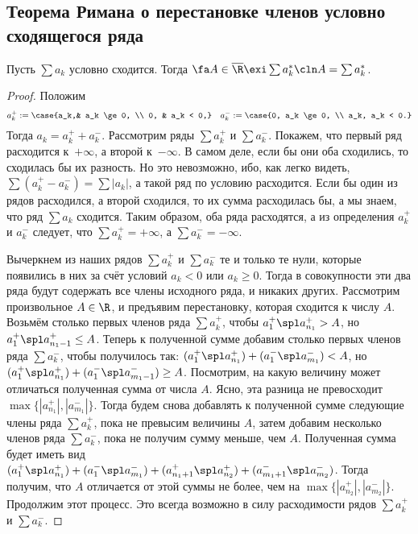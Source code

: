 \documentclass[a4paper]{article}
\newcommand{\sap}[2]{a_{{#1}}^+ \spl a_{{#2}}^+}
\newcommand{\sam}[2]{a_{{#1}}^- \spl a_{{#2}}^-}
\begin{document}
\subsection{Теорема Римана о перестановке членов условно сходящегося ряда}

\begin{theorem}[Римана]
Пусть $\sum a_k$ условно сходится. Тогда $\fa A \in \overline{\R} \exi \sum a_k^*\cln A=\sum a_k^*$.
\end{theorem}
\begin{proof}
Положим $$a_k^+ := \case{a_k,& a_k \ge 0, \\ 0, & a_k < 0,} \quad
a_k^- := \case{0, a_k \ge 0, \\ a_k, a_k < 0.}$$
Тогда $a_k = a_k^+ + a_k^-$. Рассмотрим ряды
$\sum a_k^+$ и $\sum a_k^-$. Покажем, что первый ряд расходится к~$+\infty$, а второй к~$-\infty$. В самом деле, если бы они оба сходились,
то сходилась бы их разность. Но это невозможно, ибо, как легко видеть, $\sum (a_k^+ - a_k^-) = \sum |a_k|$, а такой ряд по условию расходится.
Если бы один из рядов расходился, а второй сходился, то их сумма расходилась бы, а мы знаем, что ряд $\sum a_k$ сходится. Таким образом,
оба ряда расходятся, а из определения $a_k^+$ и $a_k^-$ следует, что $\sum a_k^+ = +\infty$, а $\sum a_k^-=-\infty$.

Вычеркнем из наших рядов $\sum a_k^+$ и $\sum a_k^-$ те и только те нули, которые появились в них за счёт условий $a_k <0$ или $a_k \ge 0$.
Тогда в совокупности эти два ряда будут содержать все члены исходного ряда, и никаких других.
Рассмотрим произвольное $A \in \R$,
и предъявим перестановку, которая сходится к числу $A$. Возьмём столько первых членов ряда $\sum a_k^+$, чтобы
$\sap{1}{n_1} > A$, но $\sap{1}{n_1-1} \le A$. Теперь к полученной сумме добавим столько первых членов ряда $\sum a_k^-$, чтобы
получилось так: $(\sap{1}{n_1}) + (\sam{1}{m_1}) < A$, но $(\sap{1}{n_1}) + (\sam{1}{m_1-1}) \ge A$. Посмотрим, на какую величину
может отличаться полученная сумма от числа $A$. Ясно, эта разница не превосходит $\max \{|a_{n_1}^+|, |a_{m_1}^-| \}$. Тогда будем снова
добавлять к полученной сумме следующие члены ряда $\sum a_k^+$, пока не превысим величины $A$, затем добавим несколько членов ряда $\sum a_k^-$,
пока не получим сумму меньше, чем $A$. Полученная сумма будет иметь вид $(\sap{1}{n_1})+(\sam{1}{m_1})+(\sap{n_1+1}{n_2})+(\sam{m_1+1}{m_2})$.
Тогда получим, что $A$ отличается от этой суммы не более, чем на $\max \{|a_{n_2}^+|, |a_{m_2}^-| \}$. Продолжим этот процесс. Это всегда возможно
в силу расходимости рядов $\sum a_k^+$ и $\sum a_k^-$.


\end{proof}
\end{document}
